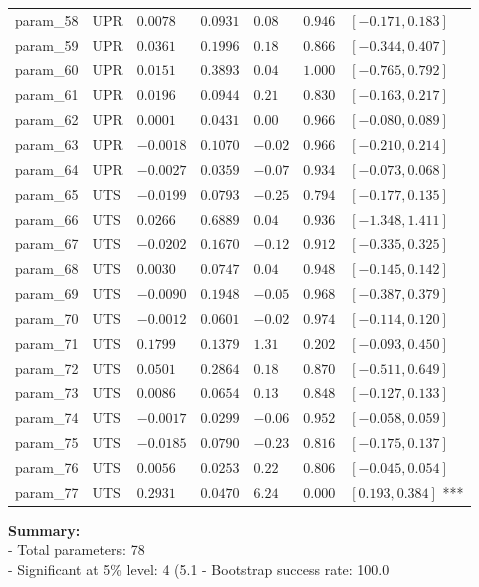 \documentclass{article}
\begin{document}
\begin{longtable}{lllllll}
param\_58 & UPR & $0.0078$ & $0.0931$ & $0.08$ & $0.946$ & $[-0.171, 0.183]$  \\
param\_59 & UPR & $0.0361$ & $0.1996$ & $0.18$ & $0.866$ & $[-0.344, 0.407]$  \\
param\_60 & UPR & $0.0151$ & $0.3893$ & $0.04$ & $1.000$ & $[-0.765, 0.792]$  \\
param\_61 & UPR & $0.0196$ & $0.0944$ & $0.21$ & $0.830$ & $[-0.163, 0.217]$  \\
param\_62 & UPR & $0.0001$ & $0.0431$ & $0.00$ & $0.966$ & $[-0.080, 0.089]$  \\
param\_63 & UPR & $-0.0018$ & $0.1070$ & $-0.02$ & $0.966$ & $[-0.210, 0.214]$  \\
param\_64 & UPR & $-0.0027$ & $0.0359$ & $-0.07$ & $0.934$ & $[-0.073, 0.068]$  \\
param\_65 & UTS & $-0.0199$ & $0.0793$ & $-0.25$ & $0.794$ & $[-0.177, 0.135]$  \\
param\_66 & UTS & $0.0266$ & $0.6889$ & $0.04$ & $0.936$ & $[-1.348, 1.411]$  \\
param\_67 & UTS & $-0.0202$ & $0.1670$ & $-0.12$ & $0.912$ & $[-0.335, 0.325]$  \\
param\_68 & UTS & $0.0030$ & $0.0747$ & $0.04$ & $0.948$ & $[-0.145, 0.142]$  \\
param\_69 & UTS & $-0.0090$ & $0.1948$ & $-0.05$ & $0.968$ & $[-0.387, 0.379]$  \\
param\_70 & UTS & $-0.0012$ & $0.0601$ & $-0.02$ & $0.974$ & $[-0.114, 0.120]$  \\
param\_71 & UTS & $0.1799$ & $0.1379$ & $1.31$ & $0.202$ & $[-0.093, 0.450]$  \\
param\_72 & UTS & $0.0501$ & $0.2864$ & $0.18$ & $0.870$ & $[-0.511, 0.649]$  \\
param\_73 & UTS & $0.0086$ & $0.0654$ & $0.13$ & $0.848$ & $[-0.127, 0.133]$  \\
param\_74 & UTS & $-0.0017$ & $0.0299$ & $-0.06$ & $0.952$ & $[-0.058, 0.059]$  \\
param\_75 & UTS & $-0.0185$ & $0.0790$ & $-0.23$ & $0.816$ & $[-0.175, 0.137]$  \\
param\_76 & UTS & $0.0056$ & $0.0253$ & $0.22$ & $0.806$ & $[-0.045, 0.054]$  \\
param\_77 & UTS & $0.2931$ & $0.0470$ & $6.24$ & $0.000$ & $[0.193, 0.384]$ *** \\
\bottomrule
\end{longtable}
\bigskip
\textbf{Summary:}\\
- Total parameters: 78\\
- Significant at 5\% level: 4 (5.1%
- Bootstrap success rate: 100.0%
\end{document}
